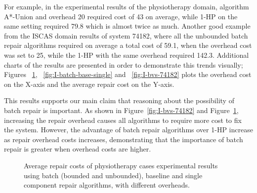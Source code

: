 \documentclass[a4paper,11pt]{report}
\newcommand\roni[1]{\textcolor{green}{roni: #1}}
\begin{document}

For example, in the experimental results of the physiotherapy domain, algorithm A*-Union and overhead 20 required cost of 43 on average, while 1-HP on the same setting required 79.8 which is almost twice as much.
Another good example from the ISCAS domain results of system 74182, where all the unbounded batch repair algorithms required on average a total cost of 59.1, when the overhead cost was set to 25, while the 1-HP with the same overhead required 142.3.
Additional charts of the results are presented in order to demonstrate this trends visually; Figures ~\ref{fig:P-all-graph}, ~\ref{fig:I-batch-base-single} and ~\ref{fig:I-bvs-74182} plots the overhead cost on the X-axis and the average repair cost on the Y-axis.


This results supports our main claim that reasoning about the possibility of batch repair is important. 
As shown in Figure~\ref{fig:I-bvs-74182} and Figure~\ref{fig:P-all-graph}, increasing the repair overhead causes all algorithms to require more cost to fix the system. However, the advantage of batch repair algorithms over 1-HP increase as repair overhead costs increases, demonstrating that the importance of batch repair is greater when overhead costs are higher. 

\begin{figure}{}
  \caption{Average repair costs of physiotherapy cases experimental results using batch (bounded and unbounded), baseline and single component repair algorithms, with different overheads.}
  \label{fig:P-all-graph}
\end{figure}
\end{document}
